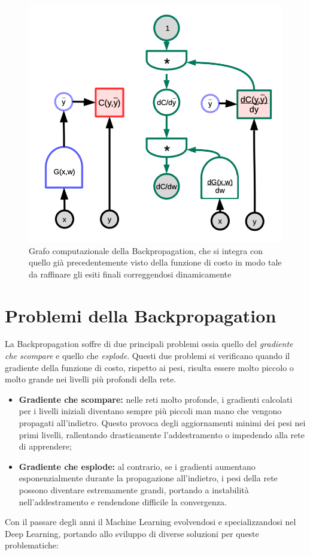 \begin{figure}
    \centering
    \includegraphics[width=0.5\linewidth]{figure/BackPropGraph.png}
    \caption{Grafo computazionale della Backpropagation, che si integra con quello già precedentemente visto della funzione di costo in modo tale da raffinare gli esiti finali correggendosi dinamicamente}
    \label{fig:backPropGraph}
\end{figure}

\section{Problemi della Backpropagation}
La Backpropagation soffre di due principali problemi ossia quello del \textit{gradiente che scompare} e quello che \textit{esplode}. Questi due problemi si verificano quando il gradiente della funzione di costo, rispetto ai pesi, risulta essere molto piccolo o molto grande nei livelli più profondi della rete.

\begin{itemize}
    \item \textbf{Gradiente che scompare:} nelle reti molto profonde, i gradienti calcolati per i livelli iniziali diventano sempre più piccoli man mano che vengono propagati all'indietro. Questo provoca degli aggiornamenti minimi dei pesi nei primi livelli, rallentando drasticamente l'addestramento o impedendo alla rete di apprendere;
    \item \textbf{Gradiente che esplode:} al contrario, se i gradienti aumentano esponenzialmente durante la propagazione all'indietro, i pesi della rete possono diventare estremamente grandi, portando a instabilità nell'addestramento e rendendone difficile la convergenza.
\end{itemize}

Con il passare degli anni il Machine Learning evolvendosi e specializzandosi nel Deep Learning, portando allo sviluppo di diverse soluzioni per queste problematiche:

